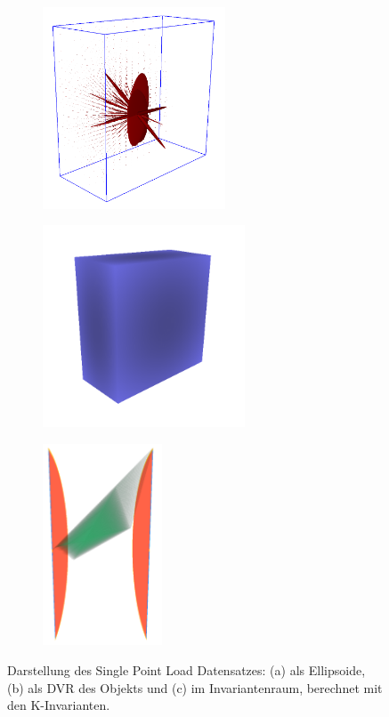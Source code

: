 \documentclass[a4paper,fontsize=12pt,toc=bib,halfparskip]{scrartcl}
\begin{document}
\begin{figure}
	\begin{subfigure}{0.3\textwidth}
		\centering
		\includegraphics[height=6cm]{pictures/results/SinglePoint_Ellipsoids.png}
		\subcaption{}
		\label{SinglePointEllipsoids}
	\end{subfigure}
	\hspace*{\fill}
	\begin{subfigure}{0.3\textwidth}
		\centering
		\includegraphics[height=6cm]{pictures/results/SinglePoint_Object.png}
		\subcaption{}
		\label{SinglePointObject}
	\end{subfigure}
	\hspace*{\fill}
	\begin{subfigure}{0.3\textwidth}
		\centering
		\includegraphics[height=6cm]{pictures/results/SinglePoint_InvariantSpace.png}
		\subcaption{}
		\label{SinglePointInvariantSpace}
	\end{subfigure}	
	\caption{Darstellung des Single Point Load Datensatzes: (a) als Ellipsoide, (b) als DVR des Objekts und (c) im Invariantenraum, berechnet mit den K-Invarianten.}
	\label{SinglePoint}
\end{figure}
\end{document}
